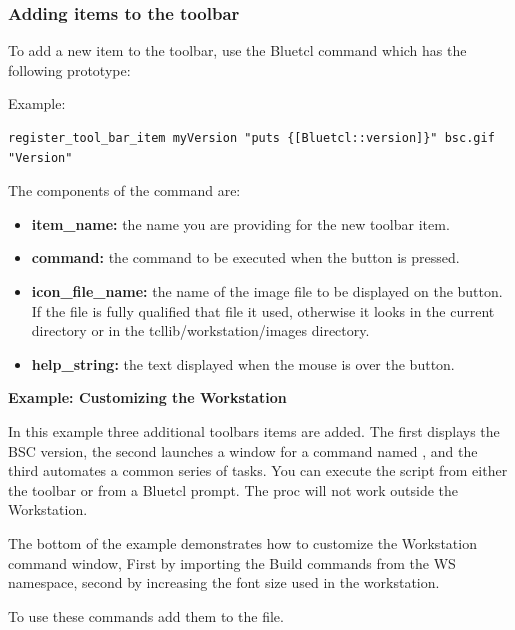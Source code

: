 \subsubsection{Adding items to the toolbar}

To add a new item to the  toolbar, use the Bluetcl command
 which has the following prototype:



Example:
\begin{verbatim}
register_tool_bar_item myVersion "puts {[Bluetcl::version]}" bsc.gif "Version"
\end{verbatim}


The components of the command  are:
\begin{itemize}
\item {\bf item\_name:} the name you are providing for the new
toolbar item.
\item {\bf command:} the command to be executed when the button is pressed.
\item {\bf icon\_file\_name:} the name of the image file to be displayed
on the button.  If the file is fully qualified that file it used,
otherwise it looks in the current directory or in the
tcllib/workstation/images directory.
\item {\bf help\_string:} the text displayed when the mouse is over the button.
\end{itemize}


{\bf Example: Customizing the Workstation}

In this example three additional toolbars items are added.  The
first displays the BSC version,  the second  launches a
window for a command named , and the third automates a
common series of tasks.   You can execute
the  script from either the toolbar or from a Bluetcl
prompt.  The proc  will not work outside the
Workstation.

The bottom of the example demonstrates how to customize the
Workstation command window, First by  importing the
Build commands from the WS namespace, second by increasing the font size
 used in the workstation.

To use these commands  add them  to the  file.  

